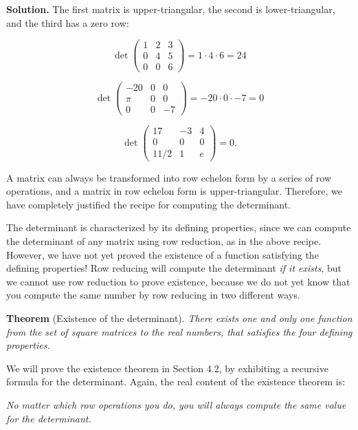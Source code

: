 \documentclass[a4paper,12pt]{article}
\begin{document}
\noindent \textbf{Solution.} The first matrix is upper-triangular, the second is lower-triangular, and the third has a zero row:

\[
\det
\begin{pmatrix}
1 & 2 & 3 \\
0 & 4 & 5 \\
0 & 0 & 6
\end{pmatrix}
= 1 \cdot 4 \cdot 6 = 24
\]

\[
\det
\begin{pmatrix}
-20 & 0 & 0 \\
\pi & 0 & 0 \\
0 & 0 & -7
\end{pmatrix}
= -20 \cdot 0 \cdot -7 = 0
\]

\[
\det
\begin{pmatrix}
17 & -3 & 4 \\
0 & 0 & 0 \\
11/2 & 1 & e
\end{pmatrix}
= 0.
\]

\noindent A matrix can always be transformed into row echelon form by a series of row operations, and a matrix in row echelon form is upper-triangular. Therefore, we have completely justified the recipe for computing the determinant.

\noindent The determinant is characterized by its defining properties, since we can compute the determinant of any matrix using row reduction, as in the above recipe. However, we have not yet proved the existence of a function satisfying the defining properties! Row reducing will compute the determinant \textit{if it exists}, but we cannot use row reduction to prove existence, because we do not yet know that you compute the same number by row reducing in two different ways.

\noindent \textbf{Theorem} (Existence of the determinant). \textit{There exists one and only one function from the set of square matrices to the real numbers, that satisfies the four defining properties.}

\noindent We will prove the existence theorem in Section 4.2, by exhibiting a recursive formula for the determinant. Again, the real content of the existence theorem is:

\begin{tcolorbox}[colframe=blue!70!black, colback=blue!5!white]
\noindent \textit{No matter which row operations you do, you will always compute the same value for the determinant.}
\end{tcolorbox}
\end{document}
